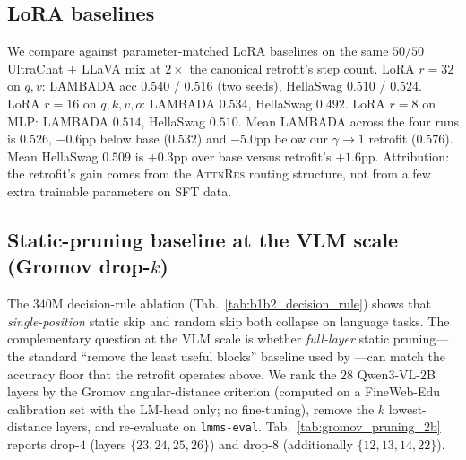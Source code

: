 \documentclass{article}
\newcommand{\attnres}{\textsc{AttnRes}}
\begin{document}
\subsection{LoRA baselines}
\label{app:lora_baselines}
We compare against parameter-matched LoRA baselines on the same $50/50$ UltraChat $+$ LLaVA mix at $2{\times}$ the canonical retrofit's step count. LoRA $r{=}32$ on $q,v$: LAMBADA acc $0.540$ / $0.516$ (two seeds), HellaSwag $0.510$ / $0.524$. LoRA $r{=}16$ on $q,k,v,o$: LAMBADA $0.534$, HellaSwag $0.492$. LoRA $r{=}8$ on MLP: LAMBADA $0.514$, HellaSwag $0.510$. Mean LAMBADA across the four runs is $0.526$, $-0.6$pp below base ($0.532$) and $-5.0$pp below our $\gamma{\to}1$ retrofit ($0.576$). Mean HellaSwag $0.509$ is $+0.3$pp over base versus retrofit's $+1.6$pp. Attribution: the retrofit's gain comes from the \attnres{} routing structure, not from a few extra trainable parameters on SFT data.

\subsection{Static-pruning baseline at the VLM scale (Gromov drop-$k$)}
\label{app:gromov_pruning}
The $340$M decision-rule ablation (Tab.~\ref{tab:b1b2_decision_rule})
shows that \emph{single-position} static skip and random skip both
collapse on language tasks. The complementary question at the VLM
scale is whether \emph{full-layer} static pruning---the standard
``remove the least useful blocks'' baseline used by
\citet{gromov2024unreasonable}---can match the accuracy floor that the
retrofit operates above. We rank the $28$ Qwen$3$-VL-$2$B layers by
the Gromov angular-distance criterion (computed on a
FineWeb-Edu calibration set with the LM-head only; no fine-tuning),
remove the $k$ lowest-distance layers, and re-evaluate on
\texttt{lmms-eval}. Tab.~\ref{tab:gromov_pruning_2b} reports drop-$4$
(layers $\{23,24,25,26\}$) and drop-$8$ (additionally
$\{12,13,14,22\}$).
\end{document}

